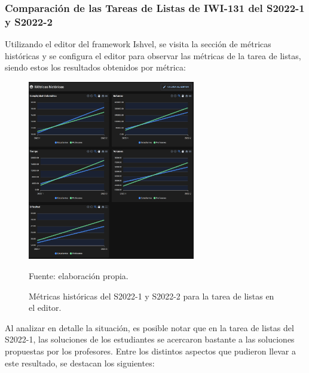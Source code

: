 \documentclass[letterpaper,12pt]{article}
\begin{document}
\subsubsection{Comparación de las Tareas de Listas de IWI-131 del S2022-1 y S2022-2}

Utilizando el editor del framework Ishvel, se visita la sección de métricas históricas y se configura el editor para observar las métricas de la tarea de listas, siendo estos los resultados obtenidos por métrica:
\begin{figure}[H]
  \centering
  \includegraphics[width=0.65\textwidth]{figures/metricstList.png}
  \caption{Métricas históricas del S2022-1 y S2022-2 para la tarea de listas en el editor.} Fuente: elaboración propia.
  \label{img:metricstList}
\end{figure}
Al analizar en detalle la situación, es posible notar que en la tarea de listas del S2022-1, las soluciones de los estudiantes se acercaron bastante a las soluciones propuestas por los profesores. Entre los distintos aspectos que pudieron llevar a este resultado, se destacan los siguientes:
\end{document}

